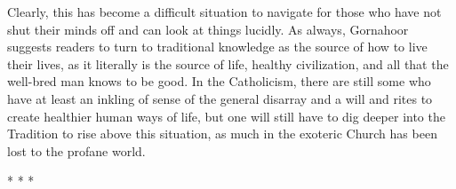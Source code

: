 Clearly, this has become a difficult situation to navigate for those who have not shut their minds off and can look at things lucidly. As always, Gornahoor suggests readers to turn to traditional knowledge as the source of how to live their lives, as it literally is the source of life, healthy civilization, and all that the well-bred man knows to be good. In the Catholicism, there are still some who have at least an inkling of sense of the general disarray and a will and rites to create healthier human ways of life, but one will still have to dig deeper into the Tradition to rise above this situation, as much in the exoteric Church has been lost to the profane world.



\begin{center}* * *\end{center}

